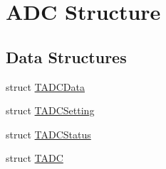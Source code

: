 \hypertarget{group___adc_strc}{\section{A\-D\-C Structure}
\label{group___adc_strc}
}
\subsection*{Data Structures}
\begin{DoxyCompactItemize}
\item 
struct \hyperlink{struct_t_a_d_c_data}{T\-A\-D\-C\-Data}
\item 
struct \hyperlink{struct_t_a_d_c_setting}{T\-A\-D\-C\-Setting}
\item 
struct \hyperlink{struct_t_a_d_c_status}{T\-A\-D\-C\-Status}
\item 
struct \hyperlink{struct_t_a_d_c}{T\-A\-D\-C}
\end{DoxyCompactItemize}
